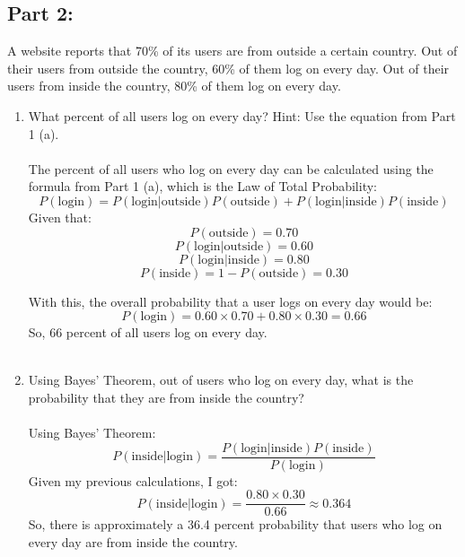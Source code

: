 \documentclass{amsart}
\theoremstyle{definition}
\theoremstyle{Exercise}
\theoremstyle{remark}
\theoremstyle{rule}
\numberwithin{equation}{section}
\begin{document}
	\subsection*{Part 2:}
	A website reports that 70\% of its users are from outside a certain country. Out
	of their users from outside the country, 60\% of them log on every day. Out of
	their users from inside the country, 80\% of them log on every day. \\
	\begin{enumerate}[label=(\alph{*})]
		\item What percent of all users log on every day? Hint: Use the equation from
			Part 1 (a). \\\\
			The percent of all users who log on every day can be calculated using the formula
			from Part 1 (a), which is the Law of Total Probability:
			\[
				P(\text{{login}}) = P(\text{{login}}| \text{{outside}})P(\text{{outside}}
				) + P(\text{{login}}| \text{{inside}})P(\text{{inside}})
			\]
			Given that:
			\[
				P(\text{{outside}}) = 0.70
			\]
			\[
				P(\text{{login}}| \text{{outside}}) = 0.60
			\]
			\[
				P(\text{{login}}| \text{{inside}}) = 0.80
			\]
			\[
				P(\text{{inside}}) = 1 - P(\text{{outside}}) = 0.30
			\]

			With this, the overall probability that a user logs on every day would be:
			\[
				P(\text{{login}}) = 0.60 \times 0.70 + 0.80 \times 0.30 = 0.66
			\]
			So, 66 percent of all users log on every day. \\\\

		\item Using Bayes’ Theorem, out of users who log on every day, what is the probability
			that they are from inside the country? \\\\
			Using Bayes’ Theorem:
			\[
				P(\text{{inside}}| \text{{login}}) = \frac{P(\text{{login}} |
				\text{{inside}})P(\text{{inside}})}{P(\text{{login}})}
			\]
			Given my previous calculations, I got:
			\[
				P(\text{{inside}}| \text{{login}}) = \frac{0.80 \times 0.30}{0.66}\approx
				0.364
			\]
			So, there is approximately a 36.4 percent probability that users who log on
			every day are from inside the country. \\\\
	\end{enumerate}
	\newpage
\end{document}
